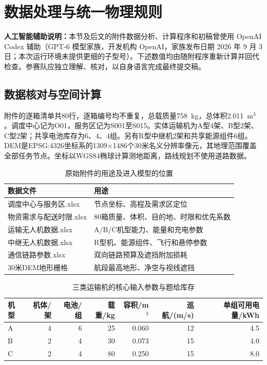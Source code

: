 \section{数据处理与统一物理规则}

\noindent\textbf{人工智能辅助说明：}本节及后文的附件数据分析、计算程序和初稿曾使用 OpenAI Codex 辅助（GPT-6 模型家族，开发机构 OpenAI，家族发布日期 2026 年 9 月 3 日；本次运行环境未提供更细的子型号）。下述数值均由随附程序重新计算并回代检查。参赛队应独立理解、核对，以自身语言完成最终提交稿。

\subsection{数据核对与空间计算}

附件的逐箱清单共80行，逐箱编号均不重复，总载质量758~kg，总体积2.011~m$^3$。调度中心记为O01，服务区记为S001至S015。实体运输机为A型4架、B型2架、C型2架；共享电池库存为6、4、4组。另有R型中继机2架和共享能源组件6组。DEM是EPSG:4326坐标系的1309$\times$1486个30米名义分辨率像元，其地理范围覆盖全部任务节点。坐标以WGS84椭球计算测地距离，路线规划不使用道路数据。

\begin{table}[H]\centering\small
\caption{原始附件的用途及进入模型的位置}\label{tab:data_files}
\begin{tabular}{ll}\toprule
数据文件 & 用途\\\midrule
调度中心与服务区.xlsx & 节点坐标、高程及需求区定位\\
物资需求与配送时限.xlsx & 80箱质量、体积、目的地、时限和优先系数\\
运输无人机数据.xlsx & A/B/C机型能力、能量和充电参数\\
中继无人机数据.xlsx & R型机、能源组件、飞行和悬停参数\\
通信链路参数.xlsx & 双向链路预算及遮挡附加损耗\\
30米DEM地形栅格 & 航段最高地形、净空与视线遮挡\\\bottomrule
\end{tabular}\end{table}

\begin{table}[H]\centering\small
\caption{三类运输机的核心输入参数与题给库存}\label{tab:aircraft_parameters}
\begin{tabular}{lrrrrrr}\toprule
机型 & 机体/架 & 电池/组 & 载重/kg & 容积/m$^3$ & 巡航/(m/s) & 单组可用电量/kWh\\\midrule
A & 4 & 6 & 25 & 0.060 & 12 & 4.5\\
B & 2 & 4 & 30 & 0.073 & 15 & 4.0\\
C & 2 & 4 & 80 & 0.250 & 15 & 8.0\\\bottomrule
\end{tabular}\end{table}


